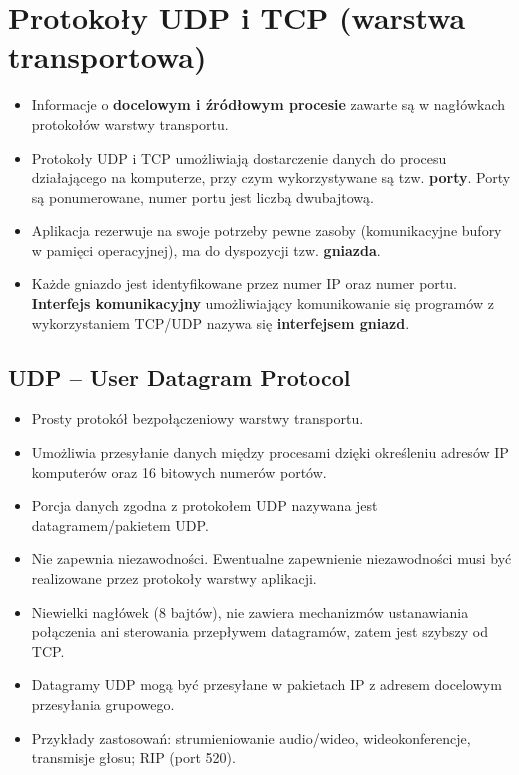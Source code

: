 \documentclass[a4paper]{article}
\begin{document}
\section{Protokoły UDP i TCP (warstwa transportowa)}
\begin{itemize}
    \item Informacje o \textbf{docelowym i źródłowym procesie} zawarte są w nagłówkach protokołów warstwy transportu.
    \item Protokoły UDP i TCP umożliwiają dostarczenie danych do procesu działającego na komputerze, przy czym wykorzystywane są tzw. \textbf{porty}. Porty są ponumerowane, numer portu jest liczbą
    dwubajtową.
    \item Aplikacja rezerwuje na swoje potrzeby pewne zasoby (komunikacyjne bufory w pamięci
    operacyjnej), ma do dyspozycji tzw. \textbf{gniazda}.
    \item Każde gniazdo jest identyfikowane przez numer IP oraz numer portu. \textbf{Interfejs komunikacyjny}  umożliwiający komunikowanie się programów z wykorzystaniem TCP/UDP nazywa się \textbf{interfejsem gniazd}.
\end{itemize}

\subsection{UDP – User Datagram Protocol}
\begin{itemize}
    \item Prosty protokół bezpołączeniowy warstwy transportu.
    \item Umożliwia przesyłanie danych między procesami dzięki określeniu adresów IP komputerów oraz 16 bitowych numerów portów.
    \item Porcja danych zgodna z protokołem UDP nazywana jest datagramem/pakietem UDP.
    \item Nie zapewnia niezawodności. Ewentualne zapewnienie niezawodności musi być realizowane przez protokoły warstwy aplikacji.
    \item Niewielki nagłówek (8 bajtów), nie zawiera mechanizmów ustanawiania połączenia ani sterowania przepływem datagramów, zatem jest szybszy od TCP.
    \item Datagramy UDP mogą być przesyłane w pakietach IP z adresem docelowym przesyłania grupowego.
    \item Przykłady zastosowań: strumieniowanie audio/wideo, wideokonferencje, transmisje głosu; RIP (port 520).
\end{itemize}
\end{document}

